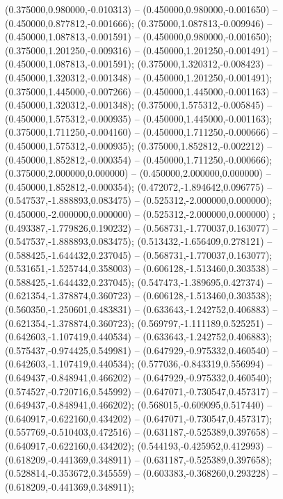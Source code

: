  (0.375000,0.980000,-0.010313) -- (0.450000,0.980000,-0.001650) -- (0.450000,0.877812,-0.001666);
 (0.375000,1.087813,-0.009946) -- (0.450000,1.087813,-0.001591) -- (0.450000,0.980000,-0.001650);
 (0.375000,1.201250,-0.009316) -- (0.450000,1.201250,-0.001491) -- (0.450000,1.087813,-0.001591);
 (0.375000,1.320312,-0.008423) -- (0.450000,1.320312,-0.001348) -- (0.450000,1.201250,-0.001491);
 (0.375000,1.445000,-0.007266) -- (0.450000,1.445000,-0.001163) -- (0.450000,1.320312,-0.001348);
 (0.375000,1.575312,-0.005845) -- (0.450000,1.575312,-0.000935) -- (0.450000,1.445000,-0.001163);
 (0.375000,1.711250,-0.004160) -- (0.450000,1.711250,-0.000666) -- (0.450000,1.575312,-0.000935);
 (0.375000,1.852812,-0.002212) -- (0.450000,1.852812,-0.000354) -- (0.450000,1.711250,-0.000666);
 (0.375000,2.000000,0.000000) -- (0.450000,2.000000,0.000000) -- (0.450000,1.852812,-0.000354);
 (0.472072,-1.894642,0.096775) -- (0.547537,-1.888893,0.083475) -- (0.525312,-2.000000,0.000000);
 (0.450000,-2.000000,0.000000) -- (0.525312,-2.000000,0.000000) ;
 (0.493387,-1.779826,0.190232) -- (0.568731,-1.770037,0.163077) -- (0.547537,-1.888893,0.083475);
 (0.513432,-1.656409,0.278121) -- (0.588425,-1.644432,0.237045) -- (0.568731,-1.770037,0.163077);
 (0.531651,-1.525744,0.358003) -- (0.606128,-1.513460,0.303538) -- (0.588425,-1.644432,0.237045);
 (0.547473,-1.389695,0.427374) -- (0.621354,-1.378874,0.360723) -- (0.606128,-1.513460,0.303538);
 (0.560350,-1.250601,0.483831) -- (0.633643,-1.242752,0.406883) -- (0.621354,-1.378874,0.360723);
 (0.569797,-1.111189,0.525251) -- (0.642603,-1.107419,0.440534) -- (0.633643,-1.242752,0.406883);
 (0.575437,-0.974425,0.549981) -- (0.647929,-0.975332,0.460540) -- (0.642603,-1.107419,0.440534);
 (0.577036,-0.843319,0.556994) -- (0.649437,-0.848941,0.466202) -- (0.647929,-0.975332,0.460540);
 (0.574527,-0.720716,0.545992) -- (0.647071,-0.730547,0.457317) -- (0.649437,-0.848941,0.466202);
 (0.568015,-0.609095,0.517440) -- (0.640917,-0.622160,0.434202) -- (0.647071,-0.730547,0.457317);
 (0.557769,-0.510403,0.472516) -- (0.631187,-0.525389,0.397658) -- (0.640917,-0.622160,0.434202);
 (0.544193,-0.425952,0.412993) -- (0.618209,-0.441369,0.348911) -- (0.631187,-0.525389,0.397658);
 (0.528814,-0.353672,0.345559) -- (0.603383,-0.368260,0.293228) -- (0.618209,-0.441369,0.348911);
